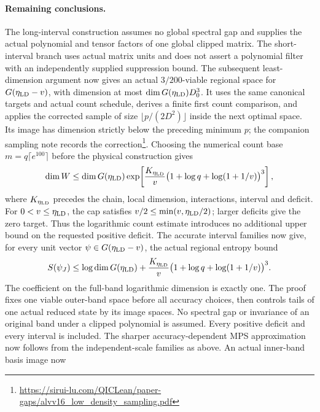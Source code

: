 \documentclass{article}
\begin{document}
\paragraph{Remaining conclusions.}
The long-interval construction assumes no global spectral gap and supplies
the actual polynomial and tensor factors of one global clipped matrix.
The short-interval branch uses actual matrix units and does not assert a
polynomial filter with an independently supplied suppression bound.
The subsequent least-dimension argument now gives an actual
$3/200$-viable regional space for $G(\eta_{\rm LD}-v)$, with dimension
at most $\dim G(\eta_{\rm LD})D_0^3$. It uses the same canonical
targets and actual count schedule, derives a finite first count comparison,
and applies the corrected sample of size
$\lfloor p/(2D^2)\rfloor$ inside the next optimal space. Its image has
dimension strictly below the preceding minimum $p$; the companion
sampling note records the correction\footnote{\url{https://sirui-lu.com/QICLean/paper-gaps/alvv16_low_density_sampling.pdf}}.
Choosing the numerical count base $m=q\lceil e^{100}\rceil$ before
the physical construction gives
\begin{align}
 \dim W\le\dim G(\eta_{\rm LD})\exp\!\left[
 \frac{K_{\eta_{\rm LD}}}{v}
 \bigl(1+\log q+\log(1+1/v)\bigr)^3\right],
    \label{eq:ld_scope_dimension_bound}
\end{align}
where $K_{\eta_{\rm LD}}$ precedes the chain, local dimension,
interactions, interval and deficit. For $0<v\le\eta_{\rm LD}$,
the cap satisfies $v/2\le\min(v,\eta_{\rm LD}/2)$; larger deficits
give the zero target. Thus the logarithmic count estimate introduces
no additional upper bound on the requested positive deficit.
The accurate interval families now give, for every unit vector
$\psi\in G(\eta_{\rm LD}-v)$, the actual regional entropy bound
\begin{align}
 S(\psi_J)\le\log\dim G(\eta_{\rm LD})+\frac{K_{\eta_{\rm LD}}}{v}
 \bigl(1+\log q+\log(1+1/v)\bigr)^3.
    \label{eq:ld_scope_regional_entropy_bound}
\end{align}
The coefficient on the full-band logarithmic dimension is exactly one.
The proof fixes one viable outer-band space before all accuracy choices,
then controls tails of one actual reduced state by its image spaces.
No spectral gap or invariance of an original band under a clipped polynomial
is assumed. Every positive deficit and every interval is included.
The sharper accuracy-dependent MPS approximation now follows from the
independent-scale families as above. An actual inner-band basis image now
\end{document}
